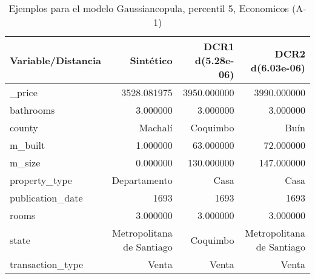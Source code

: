 \begin{table}[H]
\centering
\fontsize{10}{14}\selectfont
\caption{Ejemplos para el modelo Gaussiancopula, percentil 5, Economicos (A-1)}
\label{table-example-economicos-a-1-gaussiancopula-5p}
\begin{tabular}{|l|r|r|r|}
\hline
\rowcolor[gray]{0.8}
Variable/Distancia & Sintético & DCR1 d(5.28e-06) & DCR2 d(6.03e-06) \\
\hline \_price & \cellcolor[rgb]{0.9, 0.54, 0.52} 3528.081975 & 3950.000000 & 3990.000000 \\
\hline bathrooms & \cellcolor[rgb]{0.9, 0.54, 0.52} 3.000000 & \cellcolor[rgb]{0.9, 0.54, 0.52} 3.000000 & \cellcolor[rgb]{0.9, 0.54, 0.52} 3.000000 \\
\hline county & \cellcolor[rgb]{0.9, 0.54, 0.52} Machalí & Coquimbo & Buín \\
\hline m\_built & \cellcolor[rgb]{0.9, 0.54, 0.52} 1.000000 & 63.000000 & 72.000000 \\
\hline m\_size & \cellcolor[rgb]{0.9, 0.54, 0.52} 0.000000 & 130.000000 & 147.000000 \\
\hline property\_type & \cellcolor[rgb]{0.9, 0.54, 0.52} Departamento & Casa & Casa \\
\hline publication\_date & \cellcolor[rgb]{0.9, 0.54, 0.52} 1693 & \cellcolor[rgb]{0.9, 0.54, 0.52} 1693 & \cellcolor[rgb]{0.9, 0.54, 0.52} 1693 \\
\hline rooms & \cellcolor[rgb]{0.9, 0.54, 0.52} 3.000000 & \cellcolor[rgb]{0.9, 0.54, 0.52} 3.000000 & \cellcolor[rgb]{0.9, 0.54, 0.52} 3.000000 \\
\hline state & \cellcolor[rgb]{0.9, 0.54, 0.52} Metropolitana de Santiago & Coquimbo & \cellcolor[rgb]{0.9, 0.54, 0.52} Metropolitana de Santiago \\
\hline transaction\_type & \cellcolor[rgb]{0.9, 0.54, 0.52} Venta & \cellcolor[rgb]{0.9, 0.54, 0.52} Venta & \cellcolor[rgb]{0.9, 0.54, 0.52} Venta \\
\hline
\end{tabular}
\end{table}
